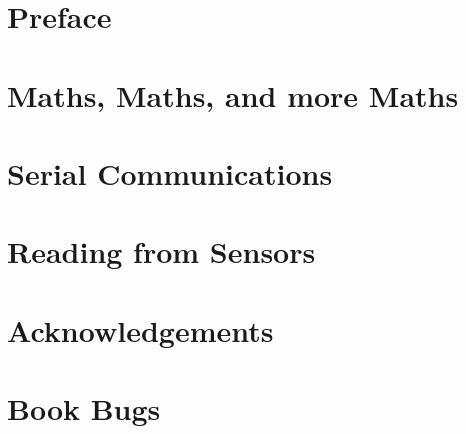 \documentclass[a5paper,oneside]{scrbook}
\begin{document}


\tableofcontents

\chapter*{Preface\label{preface}}






\chapter{Maths, Maths, and more Maths}

\chapter{Serial Communications}



\chapter{Reading from Sensors}

\chapter{Acknowledgements\label{acknowledgements}}


\chapter{Book Bugs\label{bugs}}

\end{document}

